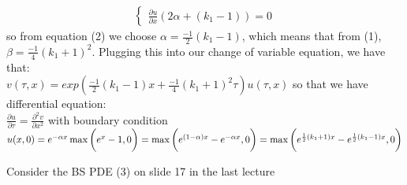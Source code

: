 \documentclass[12pt,twoside, letter]{exam}
\theoremstyle{definition}
\begin{document}
\begin{enumerate}
\begin{solution}
\begin{align}
\begin{cases}
            \frac{\partial u}{\partial x} (2\alpha + (k_1 - 1)) = 0
          \end{cases}
        \end{align}
        so from equation (2) we choose $\alpha = \frac{-1}{2}(k_1 - 1)$, which means that from (1), $\beta = \frac{-1}{4}(k_1 + 1)^2$.
        Plugging this into our change of variable equation, we have that:\\
        $v(\tau, x) = exp(\frac{-1}{2}(k_1 - 1) x + \frac{-1}{4}(k_1 + 1)^2 \tau)u(\tau, x)$ so that we have differential equation: \\
        $\frac{\partial u}{\partial \tau} = \frac{\partial^2 v}{\partial x^2}$ with boundary condition \\
        $u(x,0) = e^{-\alpha x}\max\bigg(e^{x} - 1, 0 \bigg) = \max\bigg(e^{(1 - \alpha) x} - e^{-\alpha x}, 0 \bigg) \\
        = \max\bigg(e^{\frac{1}{2}(k_1 + 1)x} - e^{\frac{1}{2}(k_1 - 1) x}, 0 \bigg)$
    \end{solution}
\end{enumerate}

\par{Consider the BS PDE (3) on slide 17 in the last lecture}
\end{document}
